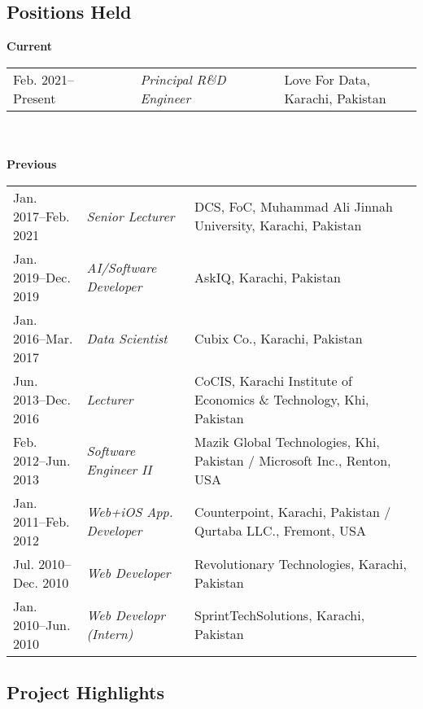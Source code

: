 \documentclass[a4paper, 10pt]{article}
\begin{document}
\subsection*{\textcolor{NavyBlue}{Positions Held}}
{\bfseries Current}\\
{
\tabcolsep=4pt
\begin{tabular}{lll}
Feb. 2021--Present\ \ \ \ \ \ & {\it Principal R\&D Engineer}\ \ \ \ \ & Love For Data, Karachi, Pakistan\\
\end{tabular}
}\\\\
{\bfseries Previous}\\
{
\tabcolsep=4pt
\begin{tabular}{lll}
Jan. 2017--Feb. 2021 & {\it Senior Lecturer} & DCS, FoC, Muhammad Ali Jinnah University, Karachi, Pakistan \\
Jan. 2019--Dec. 2019 & {\it AI/Software Developer} & AskIQ, Karachi, Pakistan \\
Jan. 2016--Mar. 2017 & {\it Data Scientist} & Cubix Co., Karachi, Pakistan \\
Jun. 2013--Dec. 2016 & {\it Lecturer} & CoCIS, Karachi Institute of Economics \& Technology, Khi, Pakistan \\
Feb. 2012--Jun. 2013 & {\it Software Engineer II} & Mazik Global Technologies, Khi, Pakistan / Microsoft Inc., Renton, USA \\
Jan. 2011--Feb. 2012 & {\it Web+iOS App. Developer} & Counterpoint, Karachi, Pakistan / Qurtaba LLC., Fremont, USA \\
Jul. 2010--Dec. 2010 & {\it Web Developer} & Revolutionary Technologies, Karachi, Pakistan\\
Jan. 2010--Jun. 2010 & {\it Web Developr (Intern)} & SprintTechSolutions, Karachi, Pakistan
\end{tabular}
}

\subsection*{\textcolor{NavyBlue}{Project Highlights}}
\end{document}
